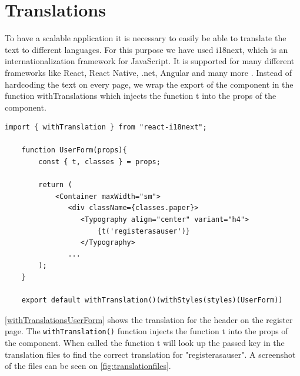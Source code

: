 \section{Translations}
To have a scalable application it is necessary to easily be able to translate the text to different languages.
For this purpose we have used i18next, which is an internationalization framework for JavaScript.
It is supported for many different frameworks like React, React Native, .net, Angular and many more \cite{react-i18next}.
Instead of hardcoding the text on every page, we wrap the export of the component in the function withTranslations which injects the function t into the props of the component.  

\begin{lstlisting}[caption={Translated header when registering as a user.}, captionpos=b, label={withTranslationsUserForm}]
    import { withTranslation } from "react-i18next";

    function UserForm(props){
        const { t, classes } = props;

        return (
            <Container maxWidth="sm">
               <div className={classes.paper}>
                  <Typography align="center" variant="h4">
                      {t('registerasauser')}
                  </Typography>
               ...
        );
    }

    export default withTranslation()(withStyles(styles)(UserForm))
\end{lstlisting}
\noindent
\autoref{withTranslationsUserForm} shows the translation for the header on the register page.
The \texttt{withTranslation()} function injects the function t into the props of the component. When called the function t will look up the passed key in the translation files to find the correct translation for "registerasauser". 
A screenshot of the files can be seen on \autoref{fig:translationfiles}.
